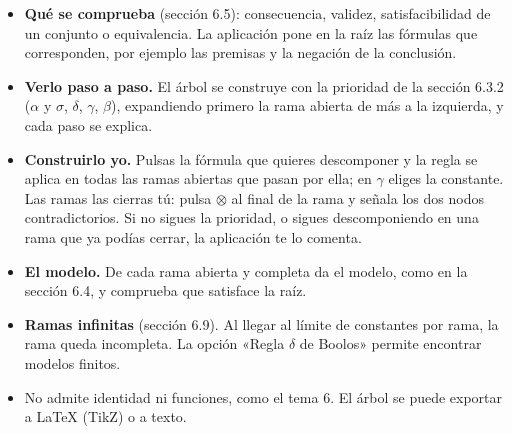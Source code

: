 \documentclass[a4paper,spanish,11pt]{article}
\begin{document}
\begin{itemize}
    \item \textbf{Qué se comprueba} (sección 6.5): consecuencia, validez, satisfacibilidad de un conjunto o equivalencia. La aplicación pone en la raíz las fórmulas que corresponden, por ejemplo las premisas y la negación de la conclusión.
    \item \textbf{Verlo paso a paso.} El árbol se construye con la prioridad de la sección 6.3.2 ($\alpha$ y $\sigma$, $\delta$, $\gamma$, $\beta$), expandiendo primero la rama abierta de más a la izquierda, y cada paso se explica.
    \item \textbf{Construirlo yo.} Pulsas la fórmula que quieres descomponer y la regla se aplica en todas las ramas abiertas que pasan por ella; en $\gamma$ eliges la constante. Las ramas las cierras tú: pulsa $\otimes$ al final de la rama y señala los dos nodos contradictorios. Si no sigues la prioridad, o sigues descomponiendo en una rama que ya podías cerrar, la aplicación te lo comenta.
    \item \textbf{El modelo.} De cada rama abierta y completa da el modelo, como en la sección 6.4, y comprueba que satisface la raíz.
    \item \textbf{Ramas infinitas} (sección 6.9). Al llegar al límite de constantes por rama, la rama queda incompleta. La opción «Regla $\delta$ de Boolos» permite encontrar modelos finitos.
    \item No admite identidad ni funciones, como el tema 6. El árbol se puede exportar a \LaTeX{} (TikZ) o a texto.
\end{itemize}
\end{document}
